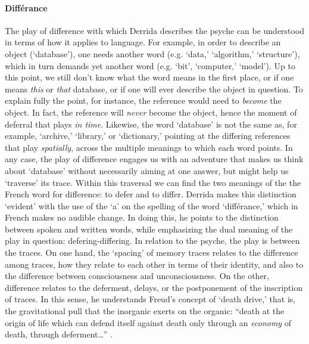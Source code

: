 \paragraph{Différance}
The play of difference with which Derrida describes the psyche can be understood in terms of how it applies to language. For example, in order to describe an object (`database'), one needs another word (e.g. `data,' `algorithm,' `structure'), which in turn demands yet another word (e.g. `bit', `computer,' `model'). Up to this point, we still don't know what the word means in the first place, or if one means \textit{this} or \textit{that} database, or if one will ever describe the object in question. To explain fully the point, for instance, the reference would need to \textit{become} the object. In fact, the reference will \textit{never} become the object, hence the moment of deferral that plays \textit{in time}. Likewise, the word `database' is not the same as, for example, `archive,' `library,' or `dictionary,' pointing at the differing references that play \textit{spatially}, across the multiple meanings to which each word points. In any case, the play of difference engages us with an adventure that makes us think about `database' without necessarily aiming at one answer, but might help us `traverse' its trace. Within this traversal we can find the two meanings of the the French word for difference: to defer and to differ. Derrida makes this distinction `evident' with the use of the `a' on the spelling of the word `différance,' which in French makes no audible change. In doing this, he points to the distinction between spoken and written words, while emphasizing the dual meaning of the play in question: defering-differing. In relation to the psyche, the play is between the traces. On one hand, the `spacing' of memory traces relates to the difference among traces, how they relate to each other in terms of their identity, and also to the difference between consciousness and unconsciousness. On the other, difference relates to the deferment, delays, or the postponement of the inscription of traces. In this sense, he understands Freud's concept of `death drive,' that is, the gravitational pull that the inorganic exerts on the organic: ``death at the origin of life which can defend itself against death only through an \textit{economy} of death, through deferment\dots'' \parencite[202]{Der78:Wri}.

